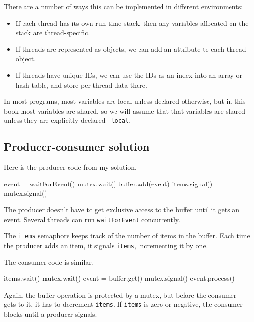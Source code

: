 \documentclass{book}
\begin{document}
There are a number of ways this can be implemented in different
environments:

\begin{itemize}

    \item If each thread has its own run-time stack, then any variables
          allocated on the stack are thread-specific.

    \item If threads are represented as objects, we can add an attribute
          to each thread object.

    \item If threads have unique IDs, we can use the IDs as an index
          into an array or hash table, and store per-thread data there.

\end{itemize}

In most programs, most variables are local unless declared otherwise,
but in this book most variables are shared, so we will assume that
that variables are shared unless they are explicitly declared {\tt
        local}.




\subsection{Producer-consumer solution}

Here is the producer code from my solution.

\begin{unbreakable}[title={Producer solution}]{}
event = waitForEvent()
mutex.wait()
    buffer.add(event)
    items.signal()
mutex.signal()
\end{unbreakable}

The producer doesn't have to get exclusive access to the buffer
until it gets an event.  Several threads can run {\tt waitForEvent}
concurrently.

The {\tt items} semaphore keeps track of the
number of items in the buffer.  Each time the producer adds an
item, it signals {\tt items}, incrementing it by one.

The consumer code is similar.

\begin{unbreakable}[title={Consumer solution}]{}
items.wait()
mutex.wait()
    event = buffer.get()
mutex.signal()
event.process()
\end{unbreakable}

Again, the buffer operation is protected by a mutex,
but before the consumer gets to it, it has to decrement
    {\tt items}.  If {\tt items} is zero or negative, the
consumer blocks until a producer signals.
\end{document}

